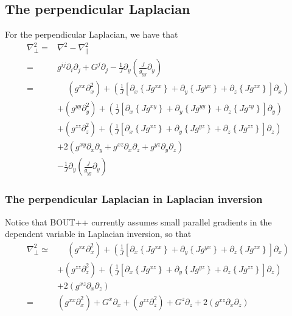 \documentclass[12pt]{article}
\def\L{\left}
\def\R{\right}
\newcommand{\Grad}{\ensuremath{\nabla}}
\begin{document}
\subsection{The perpendicular Laplacian}
%
For the perpendicular Laplacian, we have that
%
\begin{align*}
    \Grad_\perp^2 =& \Grad^2 - \Grad_\|^2\\ =& g^{ij} \partial_i \partial_j +
    G^j \partial_j -\frac{1}{J} \partial_y \L(\frac{J}{g_{yy}} \partial_y\R)\\
%
            =& \quad \, \L(g^{xx} \partial_x^2\R) + \L( \frac{1}{J} \L[
\partial_x \L\{J g^{xx} \R\} + \partial_y \L\{J g^{yx} \R\} + \partial_z \L\{J
g^{zx} \R\} \R] \partial_x\R)\\ &+ \L(g^{yy} \partial_y^2\R) + \L( \frac{1}{J}
    \L[ \partial_x \L\{J g^{xy} \R\} + \partial_y \L\{J g^{yy} \R\} +
    \partial_z \L\{J g^{zy} \R\} \R] \partial_y\R)\\ &+ \L(g^{zz}
        \partial_z^2\R) + \L( \frac{1}{J} \L[ \partial_x \L\{J g^{xz} \R\} +
        \partial_y \L\{J g^{yz} \R\} + \partial_z \L\{J g^{zz} \R\} \R]
        \partial_z\R)\\ &+ 2\L( g^{xy} \partial_x \partial_y + g^{xz}
        \partial_x \partial_z + g^{yz} \partial_y \partial_z \R)\\ &-
        \frac{1}{J} \partial_y \L(\frac{J}{g_{yy}} \partial_y\R)
\end{align*}
%


\subsubsection{The perpendicular Laplacian in Laplacian inversion}
%
Notice that BOUT++ currently assumes small parallel gradients in the dependent
variable in Laplacian inversion, so that
%
\begin{align*}
    \Grad_\perp^2 \simeq& \quad \, \L(g^{xx} \partial_x^2\R) + \L( \frac{1}{J}
    \L[ \partial_x \L\{J g^{xx} \R\} + \partial_y \L\{J g^{yx} \R\} +
    \partial_z \L\{J g^{zx} \R\} \R] \partial_x\R)\\ &+ \L(g^{zz}
        \partial_z^2\R) + \L( \frac{1}{J} \L[ \partial_x \L\{J g^{xz} \R\} +
        \partial_y \L\{J g^{yz} \R\} + \partial_z \L\{J g^{zz} \R\} \R]
        \partial_z\R)\\ &+ 2\L(g^{xz} \partial_x \partial_z\R)\\
%
           =& \L(g^{xx} \partial_x^2\R) + G^x\partial_x + \L(g^{zz}
        \partial_z^2\R) + G^z \partial_z + 2\L(g^{xz} \partial_x \partial_z\R)
\end{align*}
%
\end{document}
